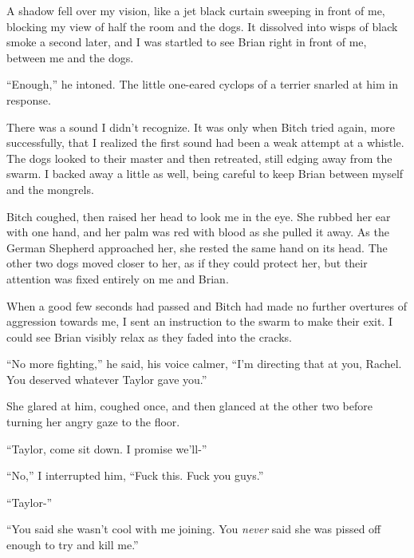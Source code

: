A shadow fell over my vision, like a jet black curtain sweeping in front of me, blocking my view of half the room and the dogs.  It dissolved into wisps of black smoke a second later, and I was startled to see Brian right in front of me, between me and the dogs.



``Enough,'' he intoned.  The little one-eared cyclops of a terrier snarled at him in response.



There was a sound I didn't recognize.  It was only when Bitch tried again, more successfully, that I realized the first sound had been a weak attempt at a whistle.  The dogs looked to their master and then retreated, still edging away from the swarm.  I backed away a little as well, being careful to keep Brian between myself and the mongrels.



Bitch coughed, then raised her head to look me in the eye.  She rubbed her ear with one hand, and her palm was red with blood as she pulled it away.  As the German Shepherd approached her, she rested the same hand on its head.  The other two dogs moved closer to her, as if they could protect her, but their attention was fixed entirely on me and Brian.



When a good few seconds had passed and Bitch had made no further overtures of aggression towards me, I sent an instruction to the swarm to make their exit.  I could see Brian visibly relax as they faded into the cracks.



``No more fighting,'' he said, his voice calmer, ``I'm directing that at you, Rachel.  You deserved whatever Taylor gave you.''



She glared at him, coughed once, and then glanced at the other two before turning her angry gaze to the floor.



``Taylor, come sit down.  I promise we'll-''



``No,'' I interrupted him, ``Fuck this.  Fuck you guys.''



``Taylor-''



``You said she wasn't cool with me joining.  You \emph{never} said she was pissed off enough to try and kill me.''



